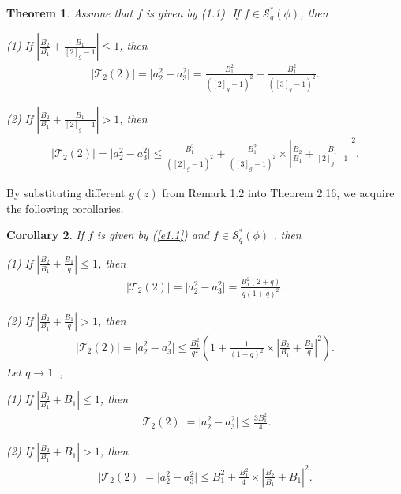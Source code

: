 \documentclass[11pt,twoside, reqno]{article}
\newtheorem{theorem}{Theorem}[section]
\newtheorem{corollary}[theorem]{Corollary}
\theoremstyle{definition}
\begin{document}
\begin{theorem}
Assume that $f$ is given by (1.1). If $f\in\mathcal{S}^{\ast }_{g}(\phi)$, then

(1) If $|\frac{B_{2}}{B_{1}}+\frac{B_{1}}{[2]_{g}-1}|\leq1$, then
\begin{align}\nonumber
\mid \mathcal{T}_2(2)\mid=\mid a_{2}^2-a_{3}^{2}\mid=
\frac{B_{1}^{2}}{([2]_{g}-1)^{2}}-\frac{B_{1}^{2}}{([3]_{g}-1)^{2}}.
\end{align}

(2) If $|\frac{B_{2}}{B_{1}}+\frac{B_{1}}{[2]_{g}-1}|>1$, then
\begin{align}\nonumber
\mid \mathcal{T}_2(2)\mid=\mid a_{2}^2-a_{3}^{2}\mid\leq
\frac{B_{1}^{2}}{([2]_{g}-1)^{2}}+\frac{B_{1}^{2}}{([3]_{g}-1)^{2}}
\times\left|\frac{B_{2}}{B_{1}}+\frac{B_{1}}{[2]_{g}-1}\right|^{2}.
\end{align}
\end{theorem}
By substituting different $g(z)$ from Remark 1.2 into Theorem 2.16, we acquire the following corollaries.
\begin{corollary}
If $f$ is given by (\ref{e1.1}) and $f\in\mathcal{S}^{\ast }_{q}(\phi)$ , then

(1) If $|\frac{B_{2}}{B_{1}}+\frac{B_{1}}{q}|\leq1$, then
\begin{align}\nonumber
\mid \mathcal{T}_2(2)\mid=\mid a_{2}^2-a_{3}^{2}\mid=
\frac{B_{1}^{2}(2+q)}{q(1+q)^{2}}.
\end{align}

(2) If $|\frac{B_{2}}{B_{1}}+\frac{B_{1}}{q}|>1$, then
\begin{align}\nonumber
\mid \mathcal{T}_2(2)\mid=\mid a_{2}^2-a_{3}^{2}\mid\leq
\frac{B_{1}^{2}}{q^{2}}\left(1+\frac{1}{(1+q)^{2}}
\times\left|\frac{B_{2}}{B_{1}}+\frac{B_{1}}{q}\right|^{2}\right).
\end{align}
Let $q\rightarrow1^{-}$,

(1) If $|\frac{B_{2}}{B_{1}}+B_{1}|\leq1$, then
\begin{align}\nonumber
\mid \mathcal{T}_2(2)\mid=\mid a_{2}^2-a_{3}^{2}\mid\leq
\frac{3B_{1}^{2}}{4}.
\end{align}

(2) If $|\frac{B_{2}}{B_{1}}+B_{1}|>1$, then
\begin{align}\nonumber
\mid \mathcal{T}_2(2)\mid=\mid a_{2}^2-a_{3}^{2}\mid\leq
B_{1}^{2}+\frac{B_{1}^{2}}{4}
\times\left|\frac{B_{2}}{B_{1}}+B_{1}\right|^{2}.
\end{align}
\end{corollary}
\end{document}
